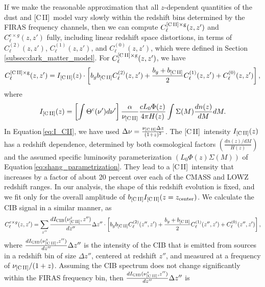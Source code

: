 \documentclass[fleqn,usenatbib]{mnras}
\newcommand{\cii}{[C{\sc\,II}]}
\begin{document}
If we make the reasonable approximation that all $z$-dependent quantities of the dust and \cii\ model vary slowly within the redshift bins determined by the FIRAS frequency channels, then we can compute $C_{\ell}^{\rm \cii \times g}(z,z')$ and $C_{\ell}^{c \times g}(z,z')$ fully, including linear redshift space distortions, in terms of $C^{(2)}_{\ell}(z,z')$, $C^{(1)}_{\ell}(z,z')$, and $C^{(0)}_{\ell}(z,z')$, which were defined in Section\,\ref{subsec:dark_matter_model}. For $C_{\ell}^{\rm \cii \times g}(z,z')$, we have
\begin{equation}\label{eq:cii_cl_full}
C_{\ell}^{\rm \cii \times g}(z,z') = I_{\rm \cii}(z) \cdot \left [ b_gb_{\rm \cii}C^{(2)}_{\ell}(z,z') + \frac{b_g + b_{\rm \cii}}{2}C^{(1)}_{\ell}(z,z') + C^{(0)}_{\ell}(z,z')  \right ], 
\end{equation}
where
\begin{equation}\label{eq:I_CII}
I_{\rm \cii}(z) = \left[\int\Theta^c(\nu')d\nu'\right]\frac{\alpha}{ \nu_{\rm \cii}}\frac{cL_0\Phi(z)}{4\pi H(z)}\int\Sigma(M)\frac{dn(z)}{dM}dM.
\end{equation}
In Equation\,\ref{eq:I_CII}, we have used $\Delta \nu = \frac{\nu_{\rm \cii} \Delta z}{(1+z)^2}$.
The \cii\ intensity $I_{\rm \cii}(z)$ has a redshift dependence, determined by both cosmological factors $\left( \frac{dn(z)/dM}{H(z)}\right)$ and the assumed specific luminosity parameterization $\left( L_0 \Phi(z) \Sigma(M) \right)$ of Equation\,\ref{eq:shang_parametrization}. They lead to a \cii\ intensity that increases by a factor of about 20 percent over each of the CMASS and LOWZ redshift ranges. In our analysis, the shape of this redshift evolution is fixed, and we fit only for the overall amplitude of $b_{\rm \cii}I_{\rm \cii}(z=z_{\rm center})$. 
We calculate the CIB signal in a similar manner, as
\begin{equation}\label{eq:cib_cl_full}
C_{\ell}^{c \times g}(z,z') =  \sum_{z''} \frac{dI_{\rm CIB}(\nu_{\rm \cii}^z,z'')}{dz''}\Delta z'' \cdot \left [ b_g b_{\rm \cii}C^{(2)}_{\ell}(z'',z') + \frac{b_g + b_{\rm \cii}}{2}C^{(1)}_{\ell}(z'',z') + C^{(0)}_{\ell}(z'',z')  \right ],
\end{equation}
where $\frac{dI_{\rm CIB}(\nu_{\rm \cii}^z,z'')}{dz''}\Delta z''$ is the intensity of the CIB that is emitted from sources in a redshift bin of size $\Delta z''$, centered at redshift $z''$, and measured at a frequency of $\nu_{\rm \cii}/(1+z)$. Assuming the CIB spectrum does not change significantly within the FIRAS frequency bin, then $\frac{dI_{\rm CIB}(\nu_{\rm \cii}^z,z'')}{dz''}\Delta z''$ is
\end{document}
